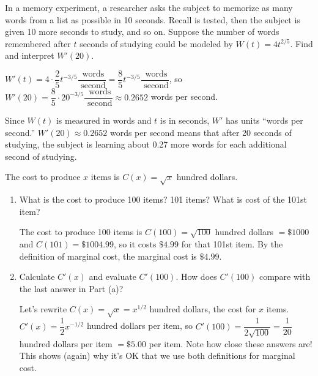 \begin{example}
In a memory experiment, a researcher asks the subject to memorize as many words from a list as possible in 10 seconds. Recall is tested, then the subject is given 10 more seconds to study, and so on. Suppose the number of words remembered after $t$ seconds of studying could be modeled by $W(t)=4t^{2/5}$. Find and interpret $W'(20)$.

\begin{solution} $W'(t)=4 \cdot \dfrac{2}{5}t^{-3/5} \dfrac{\mbox{ words}}{\mbox{ second}} =\dfrac{8}{5}t^{-3/5}\dfrac{\mbox{ words}}{\mbox{ second}}$, so $W'(20)=\dfrac{8}{5}\cdot 20^{-3/5}\dfrac{\mbox{ words}}{\mbox{ second}}\approx   0.2652$ words per second.

Since $W(t)$ is measured in words and $t$ is in seconds, $W'$ has units ``words per second.'' $W'(20)\approx 0.2652$ words per second means that after 20 seconds of studying, the subject is learning about 0.27 more words for each additional second of studying.
\end{solution}\end{example}

\begin{example}
  \label{ex:2-7-11}
The cost to produce $x$ items is $C(x) = \sqrt{x}$ hundred dollars.
    \begin{enumerate}[label=(\alph*)]
    \item What is the cost to produce 100 items? 101 items? What is cost of the 101st item?

    \begin{solution}
     The cost to produce 100 items is $C(100)=\sqrt{100}$ hundred dollars $= \$1000$ and $C(101)=\$1004.99$, so it costs $\$4.99$ for that 101st item. By the definition of marginal cost, the marginal cost is $\$4.99$.
    \end{solution}
    \item Calculate $C'(x)$ and evaluate $C'(100)$. How does $C'(100)$ compare with the last answer in Part (a)?
    
    \begin{solution} 
    Let's rewrite $C(x) = \sqrt{x} = x^{1/2}$ hundred dollars, the cost for $x$ items. $C'(x)= \dfrac{1}{2}x^{-1/2}$ hundred dollars per item, so $C'(100)=\dfrac{1}{2\sqrt{100}} = \dfrac{1}{20}$ hundred dollars per item $= \$5.00$ per item.
Note how close these answers are! This shows (again) why it's OK that we use both definitions for marginal cost.
    \end{solution}
    \end{enumerate}
\end{example}

